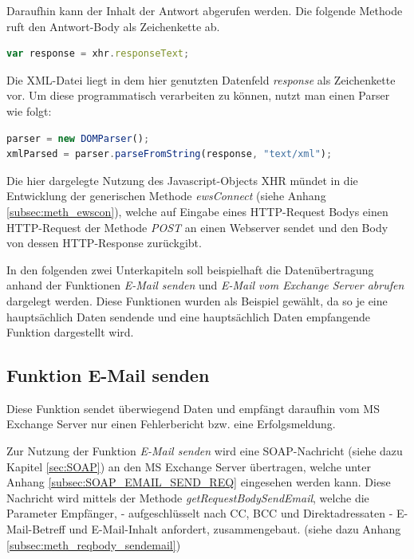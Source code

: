 Daraufhin kann der Inhalt der Antwort abgerufen werden. Die folgende Methode ruft den Antwort-Body als Zeichenkette ab.

\begin{lstlisting}[language=JavaScript] 
var response = xhr.responseText;
\end{lstlisting}

Die \ac{XML}-Datei liegt in dem hier genutzten Datenfeld \emph{response} als Zeichenkette vor. Um diese programmatisch verarbeiten zu können, nutzt man einen Parser wie folgt:

\begin{lstlisting}[language=JavaScript] 
parser = new DOMParser();
xmlParsed = parser.parseFromString(response, "text/xml");
\end{lstlisting}

Die hier dargelegte Nutzung des Javascript-Objects \ac{XHR} mündet in die Entwicklung der generischen Methode \emph{ewsConnect} (siehe Anhang \ref{subsec:meth_ewscon}), welche auf Eingabe eines HTTP-Request Bodys einen HTTP-Request der Methode \emph{POST} an einen Webserver sendet und den Body von dessen HTTP-Response zurückgibt.

In den folgenden zwei Unterkapiteln soll beispielhaft die Datenübertragung anhand der Funktionen \emph{E-Mail senden} und \emph{E-Mail vom Exchange Server abrufen} dargelegt werden. Diese Funktionen wurden als Beispiel gewählt, da so je eine hauptsächlich Daten sendende und eine hauptsächlich Daten empfangende Funktion dargestellt wird.

\subsection{Funktion E-Mail senden}
Diese Funktion sendet überwiegend Daten und empfängt daraufhin vom \ac{MS} Exchange Server nur einen Fehlerbericht bzw. eine Erfolgsmeldung.

Zur Nutzung der Funktion \emph{E-Mail senden} wird eine SOAP-Nachricht (siehe dazu Kapitel \ref{sec:SOAP}) an den \ac{MS} Exchange Server übertragen, welche unter Anhang \ref{subsec:SOAP_EMAIL_SEND_REQ} eingesehen werden kann. Diese Nachricht wird mittels der Methode \emph{getRequestBodySendEmail}, welche die Parameter Empfänger, - aufgeschlüsselt nach CC, BCC und Direktadressaten - E-Mail-Betreff und E-Mail-Inhalt anfordert, zusammengebaut. (siehe dazu Anhang \ref{subsec:meth_reqbody_sendemail})

